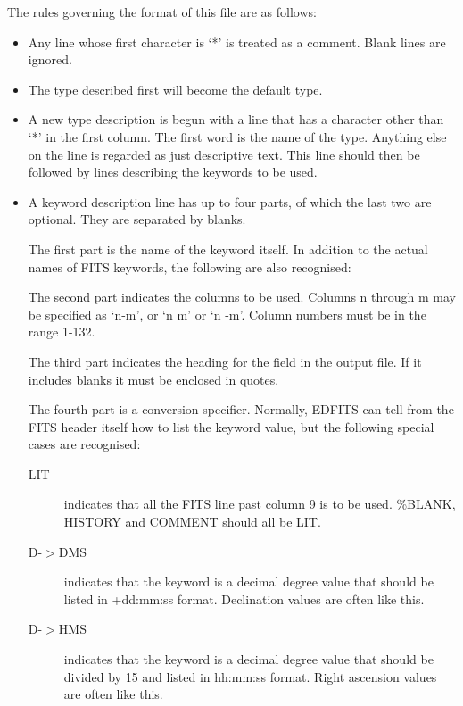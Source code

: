 The rules governing the format of this file are as follows:

\begin{itemize}

\item Any line whose first character is `*' is treated as a comment.    
Blank lines are ignored.
                                                                     
\item The type described first will become the default type.

\item A new type description is begun with a line that has a character
other than `*' in the first column.  The first word is the name
of the type.  Anything else on the line is regarded as just
descriptive text.  This line should then be followed by lines
describing the keywords to be used.

\item A keyword description line has up to four parts, of which the 
last two are optional.  They are separated by blanks.

The first part is the name of the keyword itself.  In addition
to the actual names of FITS keywords, the following are also
recognised:
The second part indicates the columns to be used.  Columns n
through m may be specified as `n-m', or `n m' or `n -m'.
Column numbers must be in the range 1-132.

The third part indicates the heading for the field in the output
file.  If it includes blanks it must be enclosed in quotes.

The fourth part is a conversion specifier.  Normally, EDFITS can
tell from the FITS header itself how to list the keyword value, but
the following special cases are recognised:
\begin{description}
\item[LIT] indicates that all the FITS line past column 9 is to be
used.  \%BLANK, HISTORY and COMMENT should all be LIT.
\item[D-$>$DMS]  indicates that the keyword is a decimal degree value that
should be listed in +dd:mm:ss format.  Declination values
are often like this.
\item[D-$>$HMS] indicates that the keyword is a decimal degree value that
should be divided by 15 and listed in hh:mm:ss format.
Right ascension values are often like this.
\end{description}


\end{itemize}
